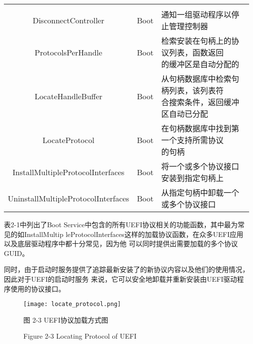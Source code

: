 \begin{table}[htb]
\begin{tabular*}{\hsize}{@{}@{\extracolsep{\fill}}ccl@{}}
{                                        }\\
    DisconnectController       &Boot  &\quad 通知一组驱动程序以停止管理控制器\\
    ProtocolsPerHandle         &Boot  &\makecell[l]{
                                       \quad 检索安装在句柄上的协议列表，函数返回\\
                                             的缓冲区是自动分配的
                                        }\\
    LocateHandleBuffer         &Boot  &\makecell[l]{
                                       \quad 从句柄数据库中检索句柄列表，该列表符\\
                                             合搜索条件，返回缓冲区自动已分配
                                        }\\
    LocateProtocol             &Boot  &\makecell[l]{
                                       \quad 在句柄数据库中找到第一个支持所需协议\\
                                             的句柄\\
                                        }\\
    InstallMultipleProtocolInterfaces
                               &Boot  &\quad 将一个或多个协议接口安装到指定句柄上\\
    UninstallMultipleProtocolInterfaces
                               &Boot  &\quad 从指定句柄中卸载一个或多个协议接口\\
	\bottomrule[0.75pt]
    \end{tabular*}
	\vspace{-0.3cm}
\end{table}

表2-1中列出了Boot Service中包含的所有UEFI协议相关的功能函数，其中最为常见的如InstallMultip
leProtocolInterfaces这样的加载协议函数，在众多UEFI应用以及底层驱动程序中都十分常见，因为他
可以同时提供出需要加载的多个协议GUID。
\par 同时，由于启动时服务提供了追踪最新安装了的新协议内容以及他们的使用情况，因此对于UEFI的启动时服务
来说，它可以安全地卸载并重新安装由UEFI驱动程序使用的协议接口。

\begin{figure}[htb]
    \label{bootint_sequence}
    \vspace{0cm}   
    \setlength{\abovecaptionskip}{0.3cm}  
	\centering
    \texttt{[image: locate\_protocol.png]}
    \caption*{图 2-3 UEFI协议加载方式图}
    \setlength{\belowcaptionskip}{-0.7cm}
    \caption*{Figure 2-3 Locating Protocol of UEFI}
\end{figure}

